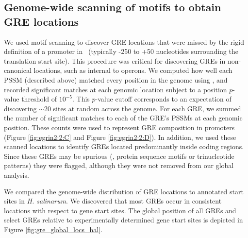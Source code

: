 \subsection{Genome-wide scanning of motifs to obtain GRE locations}
\label{section:scanning}

We used motif scanning to discover GRE locations that were missed by the rigid definition of a promoter in \cm\ (typically -250 to +50 nucleotides surrounding the translation start site). This procedure was critical for discovering GREs in non-canonical locations, such as internal to operons. We computed how well each PSSM (described above) matched every position in the genome using  \cite{bailey_methods_1998}, and recorded significant matches at each genomic location subject to a position $p$-value threshold of $10^{-5}$. This $p$-value cutoff corresponds to an expectation of discovering $\sim 20$ sites at random across the genome. For each GRE, we summed the number of significant matches to each of the GRE’s PSSMs at each genomic position. These counts were used to represent GRE composition in promoters (Figure \ref{fig:egrin2:2:C} and Figure \ref{fig:egrin2:2:D}). In addition, we used these scanned locations to identify GREs located predominantly inside coding regions. Since these GREs may be spurious (\eg, protein sequence motifs or trinucleotide patterns) they were flagged, although they were not removed from our global analysis.

We compared the genome-wide distribution of GRE locations to annotated start sites in \textit{H. salinarum}.  We discovered that most GREs occur in consistent locations with respect to gene start sites.  The global position of all GREs and select GREs relative to experimentally determined gene start sites is depicted in Figure \ref{fig:gre_global_locs_hal}.

